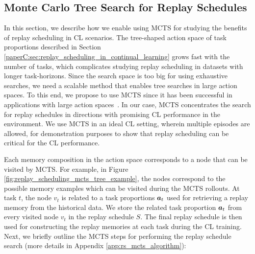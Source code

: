 
\subsection{Monte Carlo Tree Search for Replay Schedules}
\label{paperC:sec:mcts_for_replay_scheduling}

In this section, we describe how we enable using MCTS for studying the benefits of replay scheduling in CL scenarios.
The tree-shaped action space of task proportions described in Section \ref{paperC:sec:replay_scheduling_in_continual_learning} grows fast with the number of tasks, which complicates studying replay scheduling in datasets with longer task-horizons. Since the search space is too big for using exhaustive searches, 
we need a scalable method that enables tree searches in large action spaces.
To this end, we propose to use MCTS since it has been successful in applications with large action spaces~. In our case, MCTS concentrates the search for replay schedules in directions with promising CL performance in the environment. We use MCTS in an ideal CL setting, wherein multiple episodes are allowed, for demonstration purposes to show that replay scheduling can be critical for the CL performance. 

Each memory composition in the action space corresponds to a node that can be visited by MCTS. For example, in Figure \ref{fig:replay_scheduling_mcts_tree_example}, the nodes correspond to the possible memory examples which can be visited during the MCTS rollouts.
At task $t$, the node $v_t$ is related to a task proportions ${\bm{a}}_{t}$ used for retrieving a replay memory from the historical data. 
We store the related task proportion ${\bm{a}}_t$ from every visited node $v_t$ in the replay schedule $S$. 
The final replay schedule is then used for constructing the replay memories at each task during the CL training.  
Next, we briefly outline the MCTS steps for performing the replay schedule search (more details in Appendix \ref{app:rs_mcts_algorithm}):

